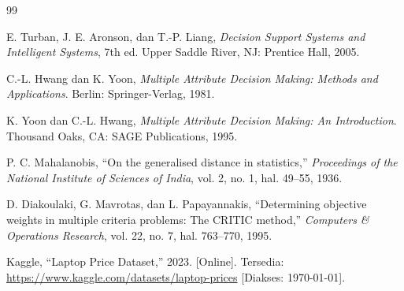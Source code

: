 \documentclass[10pt, a4paper, twocolumn]{article}
\begin{document}
\begin{thebibliography}{99}

E. Turban, J. E. Aronson, dan T.-P. Liang, \textit{Decision Support Systems and Intelligent Systems}, 7th ed. Upper Saddle River, NJ: Prentice Hall, 2005.

C.-L. Hwang dan K. Yoon, \textit{Multiple Attribute Decision Making: Methods and Applications}. Berlin: Springer-Verlag, 1981.

K. Yoon dan C.-L. Hwang, \textit{Multiple Attribute Decision Making: An Introduction}. Thousand Oaks, CA: SAGE Publications, 1995.

P. C. Mahalanobis, ``On the generalised distance in statistics,'' \textit{Proceedings of the National Institute of Sciences of India}, vol. 2, no. 1, hal. 49--55, 1936.

D. Diakoulaki, G. Mavrotas, dan L. Papayannakis, ``Determining objective weights in multiple criteria problems: The CRITIC method,'' \textit{Computers \& Operations Research}, vol. 22, no. 7, hal. 763--770, 1995.

Kaggle, ``Laptop Price Dataset,'' 2023. [Online]. Tersedia: \url{https://www.kaggle.com/datasets/laptop-prices} [Diakses: \today].

\end{thebibliography}
\end{document}
